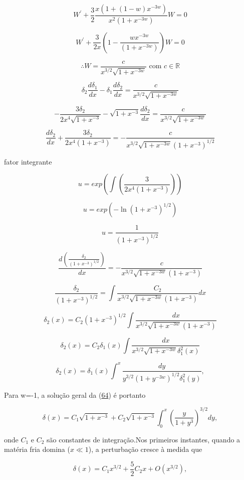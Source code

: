 \documentclass[a4paper,12pt]{article}
\begin{document}
$$W^\prime + \dfrac{3}{2}\dfrac{x(1+ (1-w)x^{-3w})}{x^2 (1+x^{-3w})}W  =0$$

$$W^\prime + \dfrac{3}{2x}\left(1 - \dfrac{wx^{-3w}}{(1+x^{-3w})}\right)W  =0$$

$$\therefore W = \dfrac{c}{x^{3/2}\sqrt{1+x^{-3w}}} \text{ 	com } c \in \mathbb{R}$$

$$\delta_2\dfrac{d\delta_1}{dx} - \delta_1\dfrac{d\delta_2}{dx} = \dfrac{c}{x^{3/2}\sqrt{1+x^{-3w}}}$$

$$-\dfrac{3\delta_2}{2x^4\sqrt{1+x^{-3}}} - \sqrt{1+x^{-3}}\dfrac{d\delta_2}{dx} = \dfrac{c}{x^{3/2}\sqrt{1+x^{-3w}}}$$

$$\dfrac{d\delta_2}{dx}+\dfrac{3\delta_2}{2x^4(1+x^{-3})} = -\dfrac{c}{x^{3/2}\sqrt{1+x^{-3w}}(1+x^{-3})^{1/2}}$$

fator integrante 

$$u= exp \left(\int \left(\dfrac{3}{2x^4(1+x^{-3})} \right)\right)$$

$$u = exp \left( -\ln(1+x^{-3})^{1/2}\right)$$

$$u = \dfrac{1}{(1+x^{-3})^{1/2}}$$

$$\dfrac{d(\frac{\delta_2}{(1+x^{-3})^{1/2}})}{dx} = -\dfrac{c}{x^{3/2}\sqrt{1+x^{-3w}}(1+x^{-3})}$$

$$\dfrac{\delta_2}{(1+x^{-3})^{1/2}} = \int\dfrac{C_2}{x^{3/2}\sqrt{1+x^{-3w}}(1+x^{-3})} dx$$

$$\delta_2(x) =C_2(1+x^{-3})^{1/2} \int\dfrac{dx}{x^{3/2}\sqrt{1+x^{-3w}}(1+x^{-3})} $$

$$\delta_2(x) =C_2\delta_1(x) \int\dfrac{dx}{x^{3/2}\sqrt{1+x^{-3w}}\delta_1^2(x)} $$

\begin{equation}\label{eq66}
	\delta_2 (x) = \delta_1 (x)\int^x \dfrac{dy}{y^{3/2}(1+y^{-3w})^{1/2}\delta^2_1 (y)},
\end{equation}

Para w=-1, a solução geral da (\hyperref[eq64]{64}) é portanto

\begin{equation}\label{eq67}
	\delta (x) = C_1 \sqrt{1+x^{-3}} + C_2\sqrt{1+x^{-3}}\int^x_0 \left( \dfrac{y}{1+y^3}\right)^{3/2} dy,
\end{equation}

onde $C_1$ e $C_2$ são constantes de integração.Nos primeiros instantes, quando a matéria fria domina ($x \ll 1$), a perturbação cresce à medida que

\begin{equation}\label{eq68}
	\delta (x) = C_1x^{3/2} +\frac{5}{2} C_2x + O(x^{3/2}),
\end{equation}
\end{document}

